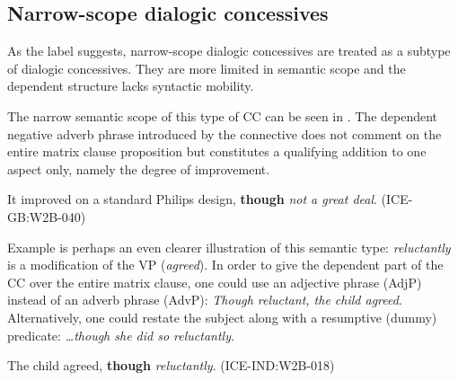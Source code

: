 \subsection{\label{bkm:Ref496776303}\label{bkm:Ref496778892}Narrow-scope dialogic concessives}\label{sec:2.2.4}

As the label suggests, narrow-scope dialogic concessives are treated as a subtype of dialogic concessives. They are more limited in semantic scope and the dependent structure lacks syntactic mobility.

The narrow semantic scope of this type of CC can be seen in . The dependent negative adverb phrase introduced by the connective does not comment on the entire matrix clause proposition but constitutes a qualifying addition to one aspect only, namely the degree of improvement.

\ea\label{ex:22}   \label{bkm:Ref496860619}It improved on a standard Philips design, \textbf{though} \textit{not a great deal}. (ICE-GB:W2B-040)\\
\z

Example  is perhaps an even clearer illustration of this semantic type: \textit{reluctantly} is a modification of the VP (\textit{agreed}). In order to give the dependent part of the CC  over the entire matrix clause, one could use an adjective phrase (AdjP) instead of an adverb phrase (AdvP): \textit{Though reluctant, the child agreed}. Alternatively, one could restate the subject along with a resumptive (dummy) predicate: \textit{…though she did so reluctantly}.

\ea\label{ex:23}   \label{bkm:Ref496860621}The child agreed, \textbf{though} \textit{reluctantly}. (ICE-IND:W2B-018)\\
\z


